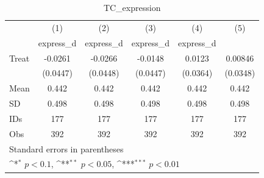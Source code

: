 \begin{table}[htbp]\centering
\def\sym#1{\ifmmode^{#1}\else\(^{#1}\)\fi}
\caption{TC\_expression}
\begin{tabular}{l*{5}{c}}
\hline\hline
                                &\multicolumn{1}{c}{(1)}&\multicolumn{1}{c}{(2)}&\multicolumn{1}{c}{(3)}&\multicolumn{1}{c}{(4)}&\multicolumn{1}{c}{(5)}\\
                                &\multicolumn{1}{c}{express\_d}&\multicolumn{1}{c}{express\_d}&\multicolumn{1}{c}{express\_d}&\multicolumn{1}{c}{express\_d}&\multicolumn{1}{c}{}\\
\hline
Treat                           &  -0.0261         &  -0.0266         &  -0.0148         &   0.0123         &  0.00846         \\
                                & (0.0447)         & (0.0448)         & (0.0447)         & (0.0364)         & (0.0348)         \\
\hline
Mean                            &    0.442         &    0.442         &    0.442         &    0.442         &    0.442         \\
SD                              &    0.498         &    0.498         &    0.498         &    0.498         &    0.498         \\
IDs                             &      177         &      177         &      177         &      177         &      177         \\
Obs                             &      392         &      392         &      392         &      392         &      392         \\
\hline\hline
\multicolumn{6}{l}{\footnotesize Standard errors in parentheses}\\
\multicolumn{6}{l}{\footnotesize \sym{*} \(p<0.1\), \sym{**} \(p<0.05\), \sym{***} \(p<0.01\)}\\
\end{tabular}
\end{table}
